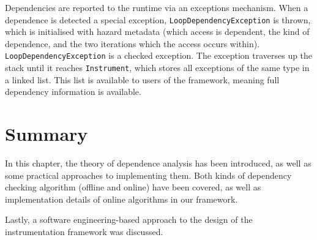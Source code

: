		Dependencies are reported to the runtime via an exceptions mechanism. When a dependence is detected a special exception, \texttt{LoopDependencyException} is thrown, which is initialised with hazard metadata (which access is dependent, the kind of dependence, and the two iterations which the access occurs within). \texttt{LoopDependencyException} is a checked exception. The exception traverses up the stack until it reaches \texttt{Instrument}, which stores all exceptions of the same type in a linked list. This list is available to users of the framework, meaning full dependency information is available.

\section{Summary} \label{sec:runtime/summary}
In this chapter, the theory of dependence analysis has been introduced, as well as some practical approaches to implementing them. Both kinds of dependency checking algorithm (offline and online) have been covered, as well as implementation details of online algorithms in our framework.

Lastly, a software engineering-based approach to the design of the instrumentation framework was discussed.
